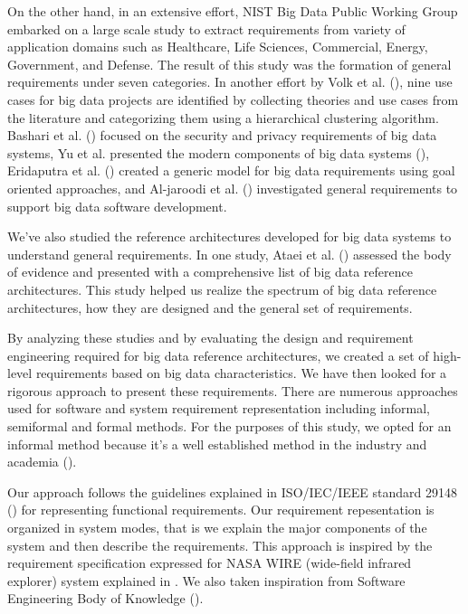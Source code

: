 \documentclass[conference]{IEEEtran}
\begin{document}
On the other hand, in an extensive effort, NIST Big Data Public Working Group embarked on a large scale study to extract requirements from variety of application domains such as Healthcare, Life Sciences, Commercial, Energy, Government, and Defense. The result of this study was the formation of general requirements under seven categories. In another effort by Volk et al. (\cite{volk2020identifying}), nine use cases for big data projects are identified by collecting theories and use cases from the literature and categorizing them using a hierarchical clustering algorithm. Bashari et al. (\cite{bashari2016security}) focused on the security and privacy requirements of big data systems, Yu et al. presented the modern components of big data systems (\cite{yu2019components}), Eridaputra et al. (\cite{eridaputra2014modeling}) created a generic model for big data requirements using goal oriented approaches, and Al-jaroodi et al. (\cite{al2016characteristics}) investigated general requirements to support big data software development. 

We've also studied the reference architectures developed for big data systems to understand general requirements. In one study, Ataei et al. (\cite{ataei2020big}) assessed the body of evidence and presented with a comprehensive list of big data reference architectures. This study helped us realize the spectrum of big data reference architectures, how they are designed and the general set of requirements.  

By analyzing these studies and by evaluating the design and requirement engineering required for big data reference architectures, we created a set of high-level requirements based on big data characteristics. We have then looked for a rigorous approach to present these requirements. There are numerous approaches used for software and system requirement representation including informal, semiformal and formal methods. For the purposes of this study, we opted for an informal method because it's a well established method in the industry and academia (\cite{kassab2014state}). 

Our approach follows the guidelines explained in ISO/IEC/IEEE standard 29148 (\cite{ISO29148}) for representing functional requirements. Our requirement repesentation is organized in system modes, that is we explain the major components of the system and then describe the requirements. This approach is inspired by the requirement specification expressed for NASA WIRE (wide-field infrared explorer) system explained in \cite{laplante2017requirements}. We also taken inspiration from Software Engineering Body of Knowledge (\cite{abran2004software}).
\end{document}
